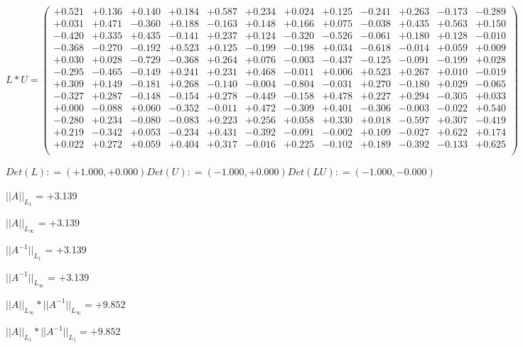 \documentclass[9pt]{article}
\theoremstyle{plain}
\theoremstyle{definition}
\theoremstyle{remark}
\numberwithin{equation}{section}
\begin{document}
$L * U  = \left(
\begin{array}{
cccccccccccc}
+0.521 & +0.136 & +0.140 & +0.184 & +0.587 & +0.234 & +0.024 & +0.125 & -0.241 & +0.263 & -0.173 & -0.289 \\
+0.031 & +0.471 & -0.360 & +0.188 & -0.163 & +0.148 & +0.166 & +0.075 & -0.038 & +0.435 & +0.563 & +0.150 \\
-0.420 & +0.335 & +0.435 & -0.141 & +0.237 & +0.124 & -0.320 & -0.526 & -0.061 & +0.180 & +0.128 & -0.010 \\
-0.368 & -0.270 & -0.192 & +0.523 & +0.125 & -0.199 & -0.198 & +0.034 & -0.618 & -0.014 & +0.059 & +0.009 \\
+0.030 & +0.028 & -0.729 & -0.368 & +0.264 & +0.076 & -0.003 & -0.437 & -0.125 & -0.091 & -0.199 & +0.028 \\
-0.295 & -0.465 & -0.149 & +0.241 & +0.231 & +0.468 & -0.011 & +0.006 & +0.523 & +0.267 & +0.010 & -0.019 \\
+0.309 & +0.149 & -0.181 & +0.268 & -0.140 & -0.004 & -0.804 & -0.031 & +0.270 & -0.180 & +0.029 & -0.065 \\
-0.327 & +0.287 & -0.148 & -0.154 & +0.278 & -0.449 & -0.158 & +0.478 & +0.227 & +0.294 & -0.305 & +0.033 \\
+0.000 & -0.088 & +0.060 & -0.352 & -0.011 & +0.472 & -0.309 & +0.401 & -0.306 & -0.003 & -0.022 & +0.540 \\
-0.280 & +0.234 & -0.080 & -0.083 & +0.223 & +0.256 & +0.058 & +0.330 & +0.018 & -0.597 & +0.307 & -0.419 \\
+0.219 & -0.342 & +0.053 & -0.234 & +0.431 & -0.392 & -0.091 & -0.002 & +0.109 & -0.027 & +0.622 & +0.174 \\
+0.022 & +0.272 & +0.059 & +0.404 & +0.317 & -0.016 & +0.225 & -0.102 & +0.189 & -0.392 & -0.133 & +0.625 \\
\end{array}
\right)$ \newline 

$Det(L) :    = (+1.000,+0.000)     Det(U) :    = (-1.000,+0.000)     Det(LU) :    = (-1.000,-0.000)$

$||A||_{L_1}$  = +3.139

$||A||_{L_{\infty}}$ = +3.139

$||A^{-1}||_{L_1}$  = +3.139

$||A^{-1}||_{L_{\infty}}$ = +3.139

$||A||_{L_{\infty}} * ||A^{-1}||_{L_{\infty}} = +9.852$

$||A||_{L_1} * ||A^{-1}||_{L_1} = +9.852$
\end{document}

